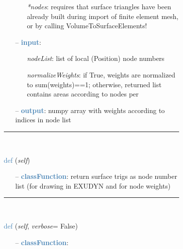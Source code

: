 \begin{itemize}[leftmargin=1.4cm]
\begin{itemize}[leftmargin=1.4cm]
\begin{itemize}[leftmargin=0.5cm]
\begin{itemize}[leftmargin=1.4cm]
\begin{itemize}[leftmargin=1.4cm]
\begin{itemize}[leftmargin=0.5cm]
\begin{itemize}[leftmargin=0.7cm]
\begin{itemize}[leftmargin=1.2cm]
    \item[] {\it **nodes}: requires that surface triangles have been already built during import of finite element mesh, or by calling VolumeToSurfaceElements!
  \end{itemize}
  \item[--]  \textcolor{steelblue}{\bf input}: \vspace{-6pt}
  \begin{itemize}[leftmargin=1.2cm]
\setlength{\itemindent}{-0.7cm}
    \item[] {\it nodeList}: list of local (Position) node numbers
    \item[] {\it   normalizeWeights}: if True, weights are normalized to sum(weights)==1; otherwise, returned list contains areas according to nodes per
  \end{itemize}
  \item[--]  \textcolor{steelblue}{\bf output}: numpy array with weights according to indices in node list\vspace{12pt}\end{itemize}
%
\noindent\rule{8cm}{0.75pt}\vspace{1pt} \\ 
\begin{flushleft}
\noindent \textcolor{steelblue}{def {\bf {}}}\label{sec:FEM:FEMinterface:GetSurfaceTriangles}
({\it self})
\end{flushleft}
\setlength{\itemindent}{0.7cm}
\begin{itemize}[leftmargin=0.7cm]
  \item[--]  \textcolor{steelblue}{\bf classFunction}: return surface trigs as node number list (for drawing in EXUDYN and for node weights)\vspace{12pt}\end{itemize}
%
\noindent\rule{8cm}{0.75pt}\vspace{1pt} \\ 
\begin{flushleft}
\noindent \textcolor{steelblue}{def {\bf {}}}\label{sec:FEM:FEMinterface:VolumeToSurfaceElements}
({\it self}, {\it verbose}= False)
\end{flushleft}
\setlength{\itemindent}{0.7cm}
\begin{itemize}[leftmargin=0.7cm]
  \item[--]  \textcolor{steelblue}{\bf classFunction}: \vspace{-6pt}

\end{itemize}
\end{itemize}
\end{itemize}
\end{itemize}
\end{itemize}
\end{itemize}
\end{itemize}
